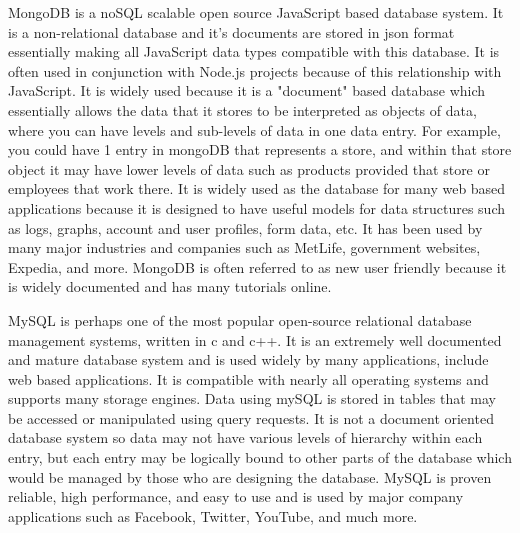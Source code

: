	
		MongoDB is a noSQL scalable open source JavaScript based database system. It is a non-relational database and it's documents are stored in json format essentially making all JavaScript data types compatible with this
		database. It is often used in conjunction with Node.js projects because of this relationship with JavaScript. It is widely used because it is a "document" based
		database which essentially allows the data that it stores to be interpreted as objects of data, where you can have levels and sub-levels of data in one data entry.
		For example, you could have 1 entry in mongoDB that represents a store, and within that store object it may have lower levels of data such as products provided that store 
		or employees that work there. It is widely used as the database for many web based applications because it is designed to have useful models for data structures
		such as logs, graphs, account and user profiles, form data, etc. It has been used by many major industries and companies such as MetLife, government websites, Expedia, and more.
		MongoDB is often referred to as new user friendly because it is widely documented and has many tutorials online. 
		
	
		MySQL is perhaps one of the most popular open-source relational database management systems, written in c and c++. It is an extremely well documented and mature database system and 
		is used widely by many applications, include web based applications. It is compatible with nearly all operating systems and supports many storage engines. Data 
		using mySQL is stored in tables that may be accessed or manipulated using query requests. It is not a document oriented database system so data may not have 
		various levels of hierarchy within each entry, but each entry may be logically bound to other parts of the database which would be managed by those who
		are designing the database. MySQL is proven reliable, high performance, and easy to use and is used by major company applications such as Facebook, Twitter, YouTube, and much more.

	
